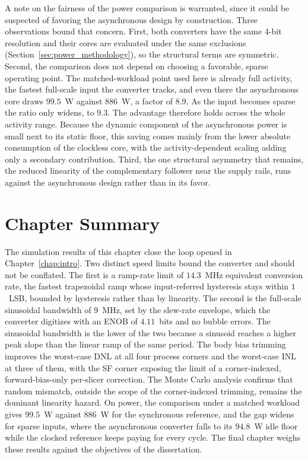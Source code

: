A note on the fairness of the power comparison is warranted, since it could be suspected of favoring the asynchronous design by construction. Three observations bound that concern. First, both converters have the same 4-bit resolution and their cores are evaluated under the same exclusions (Section~\ref{sec:power_methodology}), so the structural terms are symmetric. Second, the comparison does not depend on choosing a favorable, sparse operating point. The matched-workload point used here is already full activity, the fastest full-scale input the converter tracks, and even there the asynchronous core draws $99.5$~\textmu W against $886$~\textmu W, a factor of $8.9$. As the input becomes sparse the ratio only widens, to $9.3$. The advantage therefore holds across the whole activity range. Because the dynamic component of the asynchronous power is small next to its static floor, this saving comes mainly from the lower absolute consumption of the clockless core, with the activity-dependent scaling adding only a secondary contribution. Third, the one structural asymmetry that remains, the reduced linearity of the complementary follower near the supply rails, runs against the asynchronous design rather than in its favor.

\section{Chapter Summary}

The simulation results of this chapter close the loop opened in Chapter~\ref{chap:intro}. Two distinct speed limits bound the converter and should not be conflated. The first is a ramp-rate limit of $14.3$~MHz equivalent conversion rate, the fastest trapezoidal ramp whose input-referred hysteresis stays within $1$~LSB, bounded by hysteresis rather than by linearity. The second is the full-scale sinusoidal bandwidth of $9$~MHz, set by the slew-rate envelope, which the converter digitizes with an ENOB of $4.11$~bits and no bubble errors. The sinusoidal bandwidth is the lower of the two because a sinusoid reaches a higher peak slope than the linear ramp of the same period. The body bias trimming improves the worst-case DNL at all four process corners and the worst-case INL at three of them, with the SF corner exposing the limit of a corner-indexed, forward-bias-only per-slicer correction. The Monte Carlo analysis confirms that random mismatch, outside the scope of the corner-indexed trimming, remains the dominant linearity hazard. On power, the comparison under a matched workload gives $99.5$~\textmu W against $886$~\textmu W for the synchronous reference, and the gap widens for sparse inputs, where the asynchronous converter falls to its $94.8$~\textmu W idle floor while the clocked reference keeps paying for every cycle. The final chapter weighs these results against the objectives of the dissertation.

